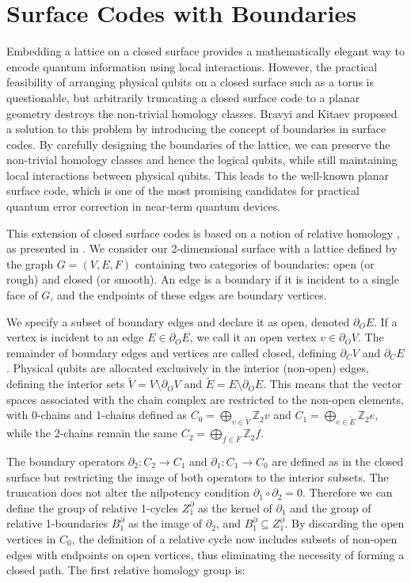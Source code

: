 \documentclass[12pt, twoside, openany]{book}
\begin{document}
\section{Surface Codes with Boundaries}

Embedding a lattice on a closed surface provides a mathematically elegant way to encode quantum information using local interactions. However, the practical feasibility of arranging physical qubits on a closed surface such as a torus is questionable, but arbitrarily truncating a closed surface code to a planar geometry destroys the non-trivial homology classes. Bravyi and Kitaev \cite{bravyi1998quantumcodeslatticeboundary} proposed a solution to this problem by introducing the concept of boundaries in surface codes. By carefully designing the boundaries of the lattice, we can preserve the non-trivial homology classes and hence the logical qubits, while still maintaining local interactions between physical qubits. This leads to the well-known planar surface code, which is one of the most promising candidates for practical quantum error correction in near-term quantum devices.

This extension of closed surface codes is based on a notion of relative homology \cite{massey1977algebraic}, as presented in \cite{delfosse2016generalizedsurfacecodespacking}. We consider our 2-dimensional surface with a lattice defined by the graph $G=(V,E,F)$ containing two categories of boundaries: open (or rough) and closed (or smooth). An edge is a boundary if it is incident to a single face of $G$, and the endpoints of these edges are boundary vertices. 

We specify a subset of boundary edges and declare it as open, denoted $\partial_O E$. If a vertex is incident to an edge $E \in \partial_O E$, we call it an open vertex $v \in \partial_O V$. The remainder of boundary edges and vertices are called closed, defining $\partial_C V$ and $\partial_C E$. Physical qubits are allocated exclusively in the interior (non-open) edges, defining the interior sets $\tilde{V} = V \setminus \partial_OV$ and $\tilde{E} = E \setminus \partial_OE$. This means that the vector spaces associated with the chain complex are restricted to the non-open elements, with 0-chains and 1-chains defined as $C_0 = \bigoplus_{v \in \tilde{V}} \mathbb{Z}_2 v$ and $C_1 = \bigoplus_{e \in \tilde{E}} \mathbb{Z}_2 e$, while the 2-chains remain the same $C_2 = \bigoplus_{f \in F} \mathbb{Z}_2 f$.

The boundary operators $\partial_2 : C_2 \rightarrow C_1$  and $\partial_1 : C_1 \rightarrow C_0$ are defined as in the closed surface but restricting the image of both operators to the interior subsets. The truncation does not alter the nilpotency condition $\partial_1 \circ \partial_2 = 0$. Therefore we can define the group of relative 1-cycles $Z_1^\partial$ as the kernel of $\partial_1$ and the group of relative 1-boundaries $B_1^\partial$ as the image of $\partial_2$, and $B_1^\partial \subseteq Z_1^\partial$. By discarding the open vertices in $C_0$, the definition of a relative cycle now includes subsets of non-open edges with endpoints on open vertices, thus eliminating the necessity of forming a closed path. The first relative homology group is:
\end{document}
